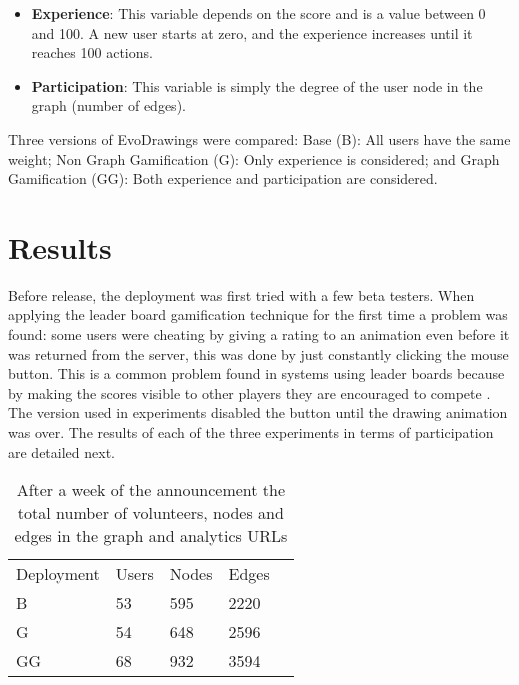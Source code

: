 \begin{itemize}
\item {\bf Experience}: This variable depends on the score and is a value 
between 0 and 100. A new user starts at zero, and the experience increases until
it reaches 100 actions.

\item {\bf Participation}: This variable is simply the degree of the user node 
in the graph (number of edges).    
\end{itemize}

Three versions of EvoDrawings were compared: Base (B): All users have the same weight;
Non Graph Gamification (G): Only experience is considered; and Graph Gamification (GG): 
Both experience and participation are considered.  

\section{Results}
\label{sec:results} 
Before release, the deployment was first tried with a few beta testers. 
When applying the leader board gamification technique for the first time a 
problem was found: some users were cheating by giving a
rating to an animation even before it was returned from the server, this was done by just
constantly clicking the mouse button. This is a common problem found in systems using leader
boards because by making the scores visible to other players they are encouraged 
to compete \cite{hickman2010total}. The version used in experiments disabled the button until 
the drawing animation was over. The results of each of the three experiments in 
terms of participation are detailed next.

\begin{table}
  \small
  \caption{After a week of the announcement the total number of volunteers, 
  nodes and edges in the graph and analytics URLs}
  \label{tab:urls} 
  \centering
  \small
  \begin{tabular}{l l l l l}
    \hline\noalign{\smallskip}
     Deployment &  Users &  Nodes &  Edges \\
    \noalign{\smallskip}\hline\noalign{\smallskip}
    B   & 53 &  595   & 2220   \\ \hline
    G   & 54 &  648   & 2596   \\ \hline
    GG  & 68 &  932   & 3594   \\ \hline
    \end{tabular}
\end{table}


